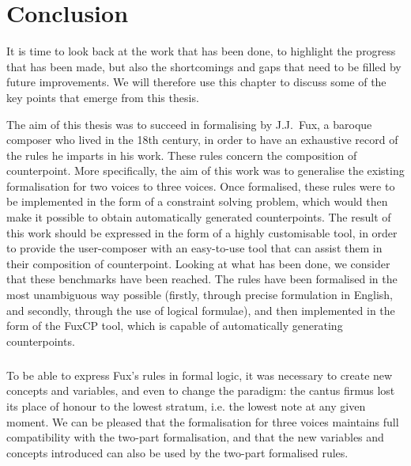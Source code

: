 \chapter*{Conclusion}\label{chapter:Conclusion}
It is time to look back at the work that has been done, to highlight the progress that has been made, but also the shortcomings and gaps that need to be filled by future improvements. We will therefore use this chapter to discuss some of the key points that emerge from this thesis.

The aim of this thesis was to succeed in formalising \gaps by J.J.~Fux, a baroque composer who lived in the 18th century, in order to have an exhaustive record of the rules he imparts in his work. These rules concern the composition of counterpoint. More specifically, the aim of this work was to generalise the existing formalisation for two voices to three voices. Once formalised, these rules were to be implemented in the form of a constraint solving problem, which would then make it possible to obtain automatically generated counterpoints. The result of this work should be expressed in the form of a highly customisable tool, in order to provide the user-composer with an easy-to-use tool that can assist them in their composition of counterpoint. Looking at what has been done, we consider that these benchmarks have been reached. The rules have been formalised in the most unambiguous way possible (firstly, through precise formulation in English, and secondly, through the use of logical formulae), and then implemented in the form of the FuxCP tool, which is capable of automatically generating counterpoints. 

\paragraph{}
To be able to express Fux's rules in formal logic, it was necessary to create new concepts and variables, and even to change the paradigm: the cantus firmus lost its place of honour to the lowest stratum, i.e. the lowest note at any given moment. We can be pleased that the formalisation for three voices maintains full compatibility with the two-part formalisation, and that the new variables and concepts introduced can also be used by the two-part formalised rules.


